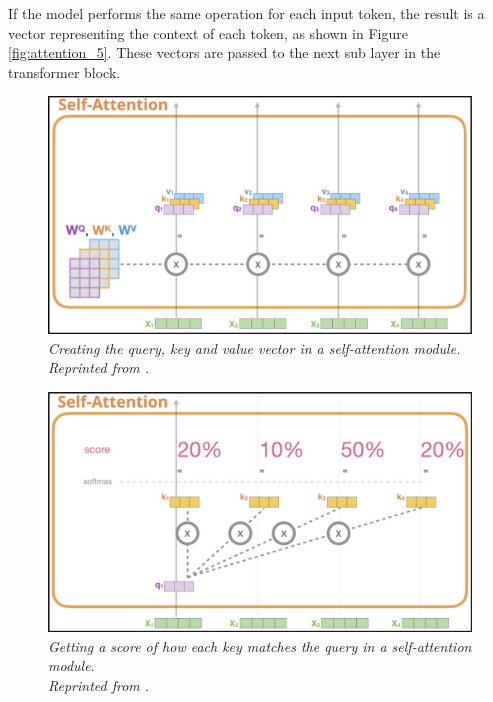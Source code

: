 If the model performs the same operation for each input token, the result is a vector representing the context of each token, as shown in Figure \ref{fig:attention_5}. These vectors are passed to the next sub layer in the transformer block.

\begin{figure}[H]
  \centering
  \caption[Creating the query, key and value vector in a self-attention module.]{\emph{Creating the query, key and value vector in a self-attention module. \\
      Reprinted from \citeauthor{alammar_2018} \citeyear{alammar_2018}.}}\label{fig:attention_2}
  \includegraphics[scale = 0.3]{figures/attention_2.jpg}
\end{figure}

\begin{figure}[H]
  \centering
  \caption[Getting a score of how each key matches the query in a self-attention module.]{\emph{Getting a score of how each key matches the query in a self-attention module. \\
      Reprinted from \citeauthor{alammar_2018} \citeyear{alammar_2018}.}}\label{fig:attention_3}
  \includegraphics[scale = 0.3]{figures/attention_3.jpg}
\end{figure}

